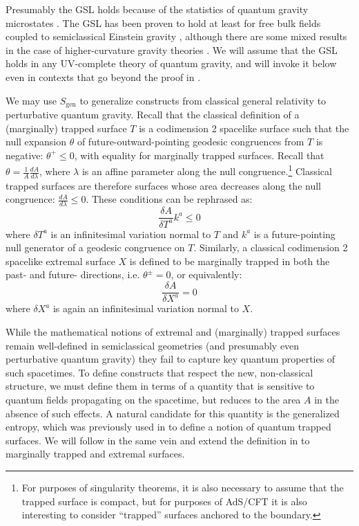 \documentclass[12pt]{article}
\theoremstyle{remark}
\numberwithin{equation}{section}
\numberwithin{equation}{section}
\begin{document}
Presumably the GSL holds because of the statistics of quantum gravity microstates \cite{Sorkin83, Wall:2009wm, Sorkin:1986mg, Frolov:1993ym, Barvinsky:1994jca}.  The GSL has been proven to hold at least for free bulk fields coupled to semiclassical Einstein gravity \cite{Wall:2009wm}, although there are some mixed results in the case of higher-curvature gravity theories \cite{Sarkar:2013swa, Jacobson:1993xs, Sarkar:2010xp, Liko:2007vi}.  We will assume that the GSL holds in any UV-complete theory of quantum gravity, and will invoke it below even in contexts that go beyond the proof in \cite{Wall:2009wm}.

We may use $S_\mathrm{gen}$ to generalize constructs from classical general relativity to perturbative quantum gravity.  Recall that the classical definition of a (marginally) trapped surface $T$ is a codimension 2 spacelike surface such that the null expansion $\theta$ of future-outward-pointing geodesic congruences from $T$ is negative: $\theta^{+}\leq 0$, with equality for marginally trapped surfaces.  Recall that $\theta = \frac{1}{A}\frac{dA}{d\lambda}$, where $\lambda$ is an affine parameter along the null congruence.\footnote{For purposes of singularity theorems, it is also necessary to assume that the trapped surface is compact, but for purposes of AdS/CFT it is also interesting to consider ``trapped'' surfaces anchored to the boundary.}  Classical trapped surfaces are therefore surfaces whose area decreases along the null congruence: $\frac{dA}{d\lambda}\leq0$.  These conditions can be rephrased as:
\begin{equation} \frac{\delta A}{\delta T^{a}}k^{a}\leq 0\end{equation}
where $\delta T^{a}$ is an infinitesimal variation normal to $T$ and $k^{a}$ is a future-pointing null generator of a geodesic congruence on $T$. Similarly, a classical codimension 2 spacelike extremal surface $X$ is defined to be marginally trapped in both the past- and future- directions, i.e. $\theta^{\pm}=0$, or equivalently:
\begin{equation} \frac{\delta A}{\delta X^{a}}=0\end{equation}
where $\delta X^{a}$ is again an infinitesimal variation normal to $X$. 

While the mathematical notions of extremal and (marginally) trapped surfaces remain well-defined in semiclassical geometries (and presumably even perturbative quantum gravity) they fail to capture key quantum properties of such spacetimes. To define constructs that respect the new, non-classical structure, we must define them in terms of a quantity that is sensitive to quantum fields propagating on the spacetime, but reduces to the area $A$ in the absence of such effects. A natural candidate for this quantity is the generalized entropy, which was previously used in \cite{Wall12} to define a notion of quantum trapped surfaces. We will follow in the same vein and extend the definition in \cite{Wall12} to marginally trapped and extremal surfaces. 
\end{document}
